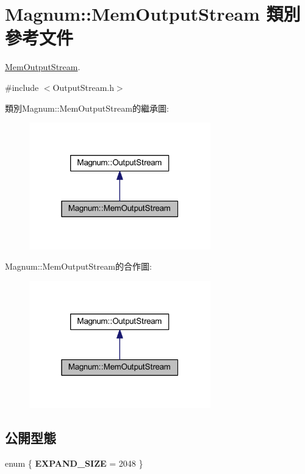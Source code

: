 \hypertarget{class_magnum_1_1_mem_output_stream}{}\section{Magnum\+:\+:Mem\+Output\+Stream 類別 參考文件}
\label{class_magnum_1_1_mem_output_stream}


\hyperlink{class_magnum_1_1_mem_output_stream}{Mem\+Output\+Stream}.  




{\ttfamily \#include $<$Output\+Stream.\+h$>$}



類別\+Magnum\+:\+:Mem\+Output\+Stream的繼承圖\+:\nopagebreak
\begin{figure}[H]
\begin{center}
\leavevmode
\includegraphics[width=223pt]{class_magnum_1_1_mem_output_stream__inherit__graph}
\end{center}
\end{figure}


Magnum\+:\+:Mem\+Output\+Stream的合作圖\+:\nopagebreak
\begin{figure}[H]
\begin{center}
\leavevmode
\includegraphics[width=223pt]{class_magnum_1_1_mem_output_stream__coll__graph}
\end{center}
\end{figure}
\subsection*{公開型態}
\begin{DoxyCompactItemize}
\item 
enum \{ {\bfseries E\+X\+P\+A\+N\+D\+\_\+\+S\+I\+ZE} = 2048
 \}\hypertarget{class_magnum_1_1_mem_output_stream_a5e79e4bfadac6fa0bf1e6dc1ce66dd45}{}\label{class_magnum_1_1_mem_output_stream_a5e79e4bfadac6fa0bf1e6dc1ce66dd45}

\end{DoxyCompactItemize}
